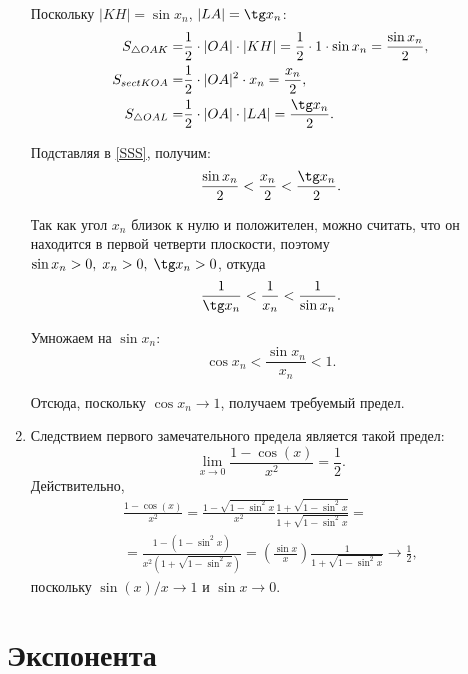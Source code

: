 \begin{enumerate}
Поскольку $|KH| = \sin x_n$, $|LA| = \tg x_n$:
\begin{align*}
S_{\triangle OAK} = & \frac{1}{2} \cdot |OA| \cdot|KH| = \frac{1}{2} \cdot 1 \cdot \sin x_n = \frac{\sin x_n}{2}, \\
S_{sect KOA} = & \frac{1}{2} \cdot |OA|^2 \cdot x_n = \frac{x_n}{2}, \\
S_{\triangle OAL} = & \frac{1}{2} \cdot |OA| \cdot |LA| = \frac{\tg x_n}{2}.
\end{align*}

Подставляя в \eqref{SSS}, получим:
$$
\frac{\sin x_n}{2} < \frac{x_n}{2} < \frac{\tg x_n}{2}.
$$

Так как угол $x_n$ близок к нулю и положителен, можно считать, что он находится в первой четверти плоскости, поэтому
$\sin x_n > 0, \; x_n > 0, \; \tg x_n > 0$, откуда
$$
\frac{1}{\tg x_n} < \frac{1}{x_n} < \frac{1}{\sin x_n}.
$$

Умножаем на $\sin x_n$:
$$
\cos x_n < \frac{\sin x_n}{x_n} < 1.
$$

Отсюда, поскольку $\cos x_n\to 1$, получаем требуемый предел.

\item Следствием первого замечательного предела является такой предел:
$$
\lim_{x\to 0}\frac{1-\cos(x)}{x^2}=\frac 12.
$$
Действительно,
\begin{multline*}
\frac{1-\cos(x)}{x^2}=\frac{1-\sqrt{1-\sin^2 x}}{x^2}\frac{1+\sqrt{1-\sin^2 x}}{1+\sqrt{1-\sin^2 x}}=\\
=\frac{1-(1-\sin^2 x)}{x^2(1+\sqrt{1-\sin^2 x})}=\left(\frac{\sin x}{x}\right)\frac{1}{1+\sqrt{1-\sin^2x}}\to \frac12,
\end{multline*}
поскольку $\sin(x)/x\to 1$ и $\sin x\to 0$.

\end{enumerate}



\section{Экспонента}




